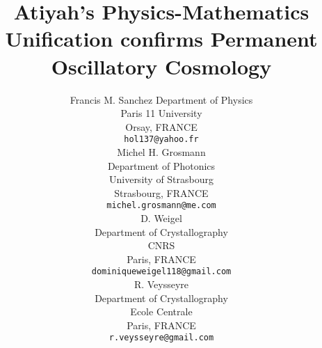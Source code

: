 \documentclass[preprint,12pt]{elsarticle}
\begin{document}
\begin{frontmatter}




\title{Atiyah's Physics-Mathematics Unification confirms Permanent Oscillatory Cosmology} %

\author{
  Francis M. Sanchez
  Department of Physics\\
  Paris 11 University\\
  Orsay, FRANCE \\
  \texttt{hol137@yahoo.fr} \\
   \And
 Michel H. Grosmann \\
  Department of Photonics\\
  University of Strasbourg\\
  Strasbourg, FRANCE \\
  \texttt{michel.grosmann@me.com} \\
   \And
 D. Weigel \\
  Department of Crystallography\\
  CNRS\\
  Paris, FRANCE \\
  \texttt{dominiqueweigel118@gmail.com} \\
   \And
 R. Veysseyre \\
  Department of Crystallography\\
  Ecole Centrale\\
  Paris, FRANCE \\
  \texttt{r.veysseyre@gmail.com} \\
}


\end{frontmatter}
\end{document}
